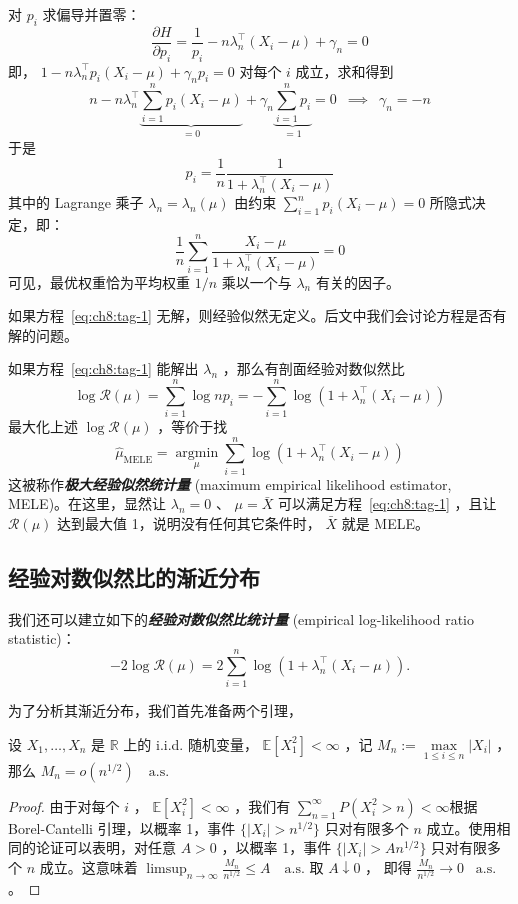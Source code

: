 对 $p_i$ 求偏导并置零：\[
\frac{\partial H}{\partial p_i} = \frac{1}{p_i} - n\lambda_n^\top (X_i - \mu) + \gamma_n = 0\]
即， $1-n\lambda_n^\top p_i(X_i - \mu)+\gamma_n p_i=0$ 对每个 $i$ 成立，求和得到 
$$n-n\lambda_n^\top\underbrace{\sum_{i=1}^n p_i(X_i - \mu)}_{=0}+\gamma_n\underbrace{\sum_{i=1}^np_i}_{=1}=0\enspace \implies \enspace \gamma_n=-n$$ 
于是
\[
p_i = \frac{1}{n}\frac{1}{1 + \lambda_n^\top (X_i - \mu)}
\]
其中的 Lagrange 乘子 $\lambda_n=\lambda_n(\mu)$ 由约束 $\sum_{i=1}^n p_i (X_i - \mu) = 0$ 所隐式决定，即：\[
\label{eq:ch8:tag-1}
\frac{1}{n}\sum_{i=1}^n \frac{X_i - \mu}{1 + \lambda_n^\top (X_i - \mu)} = 0\]
可见，最优权重恰为平均权重 $1/n$ 乘以一个与 $\lambda_n$ 有关的因子。

\begin{remark}
如果方程~\eqref{eq:ch8:tag-1} 无解，则经验似然无定义。后文中我们会讨论方程是否有解的问题。
\end{remark}

如果方程~\eqref{eq:ch8:tag-1} 能解出 $\lambda_n$ ，那么有剖面经验对数似然比\[ \log \mathcal R(\mu)=\sum_{i=1}^n\log np_i=-\sum_{i=1}^n\log(1+\lambda_n^\top (X_i-\mu)) \]
最大化上述 $\log\mathcal R(\mu)$ ，等价于找 \[ \widehat\mu_{\text{MELE}}=\operatorname*{\arg\min}_\mu \sum_{i=1}^n\log(1+\lambda_n^\top(X_i-\mu)) \]
这被称作\textbf{\emph{极大经验似然统计量 }} (maximum empirical likelihood estimator, MELE)。在这里，显然让 $\lambda_n=0$ 、 $\mu=\bar{X}$ 可以满足方程~\eqref{eq:ch8:tag-1} ，且让 $\mathcal R(\mu)$ 达到最大值 1，说明没有任何其它条件时， $\bar{X}$ 就是 MELE。

\subsection{经验对数似然比的渐近分布}

我们还可以建立如下的\textbf{\emph{经验对数似然比统计量}} (empirical log-likelihood ratio statistic)：
\[
-2\log \mathcal R(\mu)=2\sum_{i=1}^n\log(1+\lambda_n^\top(X_i-\mu)).
\]

为了分析其渐近分布，我们首先准备两个引理，

\begin{lemma}[样本极大值的阶]\label{lem:ch8:sample-maximum}

设 $X_1,\dots,X_n$ 是 $\mathbb R$ 上的 i.i.d. 随机变量， $\mathbb E[X_1^2]<\infty$ ，记 $M_n:=\max\limits_{1\le i\le n}|X_i|$ ，那么 $M_n=o(n^{1/2})\quad \text{a.s.}$

\end{lemma}

\begin{proof}

由于对每个 $i$ ， $\mathbb E[X_i^2]<\infty$ ，我们有 $\sum_{n=1}^\infty P(X_i^2>n)<\infty$根据 Borel-Cantelli 引理，以概率 1，事件 $\{|X_i|>n^{1/2}\}$ 只对有限多个 $n$ 成立。使用相同的论证可以表明，对任意 $A>0$ ，以概率 1，事件 $\{|X_i|>An^{1/2}\}$ 只对有限多个 $n$ 成立。这意味着 $\limsup_{n\to\infty} \frac{M_n}{n^{1/2}} \le A \quad \text{a.s.}$ 取 $A\downarrow 0$ ， 即得 $\frac{M_n}{n^{1/2}}\to 0\enspace \text{ a.s.}$ 。

\end{proof}

